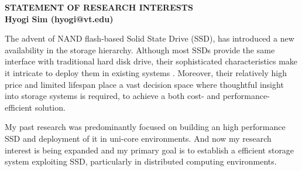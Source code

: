 \documentclass[letterpaper, 10pt]{article}
\begin{document}
\thispagestyle{fancy}
\lhead{}
\rhead{}
\renewcommand{\headrulewidth}{0pt} 
\renewcommand{\footrulewidth}{0pt} 


\pagestyle{fancy}


\begin{center}
{\Large \bf STATEMENT OF RESEARCH INTERESTS}\\
\vspace*{0.1cm}
{\bf Hyogi Sim (hyogi@vt.edu)}
\end{center}

\vspace{0.5cm}


The advent of NAND flash-based Solid State Drive (SSD), has introduced a new
availability in the storage hierarchy. Although most SSDs provide the same
interface with traditional hard disk drive, their sophisticated characteristics
make it intricate to deploy them in existing systems
\cite{flashchar}\cite{ssdtradeoffs}.
Moreover, their relatively high price and limited lifespan place a vast
decision space where thoughtful insight into storage systems is required,
to achieve a both cost- and performance- efficient solution.


My past research was predominantly focused on building an high performance SSD
and deployment of it in uni-core environments.
And now my research interest is being expanded and my primary goal
is to establish a efficient storage system exploiting
SSD, particularly in distributed computing environments.
\end{document}
